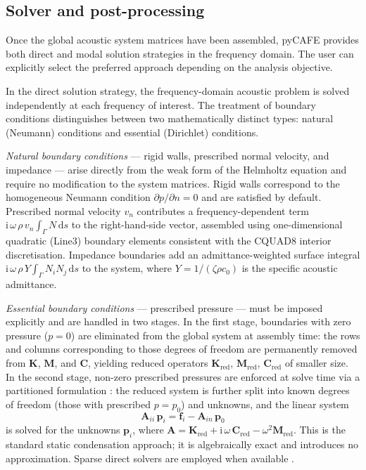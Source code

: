 \documentclass{jors}
\begin{document}
\subsection*{Solver and post-processing}
Once the global acoustic system matrices have been assembled, pyCAFE provides both direct and modal solution strategies in the frequency domain. The user can explicitly select the preferred approach depending on the analysis objective.

In the direct solution strategy, the frequency-domain acoustic problem is solved independently at each frequency of interest. The treatment of boundary conditions distinguishes between two mathematically distinct types: natural (Neumann) conditions and essential (Dirichlet) conditions.

\textit{Natural boundary conditions} --- rigid walls, prescribed normal velocity, and impedance --- arise directly from the weak form of the Helmholtz equation and require no modification to the system matrices. Rigid walls correspond to the homogeneous Neumann condition $\partial p / \partial n = 0$ and are satisfied by default. Prescribed normal velocity $v_n$ contributes a frequency-dependent term $\mathrm{i}\,\omega\,\rho\,v_n \int_\Gamma N \, \mathrm{d}s$ to the right-hand-side vector, assembled using one-dimensional quadratic (Line3) boundary elements consistent with the CQUAD8 interior discretisation. Impedance boundaries add an admittance-weighted surface integral $\mathrm{i}\,\omega\,\rho\,Y \int_\Gamma N_i N_j \, \mathrm{d}s$ to the system, where $Y = 1 / (\zeta \rho c_0)$ is the specific acoustic admittance.

\textit{Essential boundary conditions} --- prescribed pressure --- must be imposed explicitly and are handled in two stages. In the first stage, boundaries with zero pressure ($p = 0$) are eliminated from the global system at assembly time: the rows and columns corresponding to those degrees of freedom are permanently removed from $\mathbf{K}$, $\mathbf{M}$, and $\mathbf{C}$, yielding reduced operators $\mathbf{K}_\mathrm{red}$, $\mathbf{M}_\mathrm{red}$, $\mathbf{C}_\mathrm{red}$ of smaller size. In the second stage, non-zero prescribed pressures are enforced at solve time via a partitioned formulation \cite{Guyan1965,Kidder1973}: the reduced system is further split into known degrees of freedom (those with prescribed $p = p_0$) and unknowns, and the linear system
\begin{equation}
  \mathbf{A}_{ii} \, \mathbf{p}_i = \mathbf{f}_i - \mathbf{A}_{in} \, \mathbf{p}_0
\end{equation}
is solved for the unknowns $\mathbf{p}_i$, where $\mathbf{A} = \mathbf{K}_\mathrm{red} + \mathrm{i}\,\omega\,\mathbf{C}_\mathrm{red} - \omega^2 \mathbf{M}_\mathrm{red}$. This is the standard static condensation approach; it is algebraically exact and introduces no approximation. Sparse direct solvers are employed when available \cite{Damhaug1993}.
\end{document}
